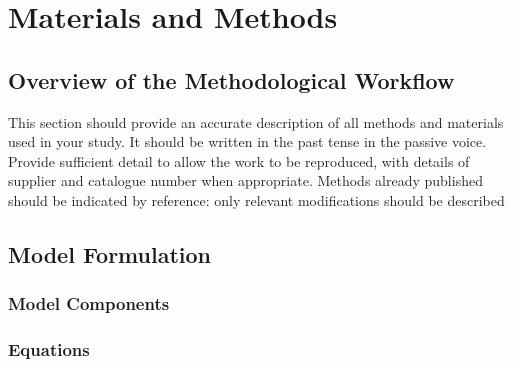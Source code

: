 
\chapter{Materials and Methods}

\section{Overview of the Methodological Workflow}


%

This section should provide an accurate description of all methods and materials used in your study. It should be written in the past tense in the passive voice. Provide sufficient detail to allow the work to be reproduced, with details of supplier and catalogue number when appropriate. Methods already published should be indicated by reference: only relevant modifications should be described

\section{Model Formulation}

\subsection{Model Components}


\subsection{Equations}

